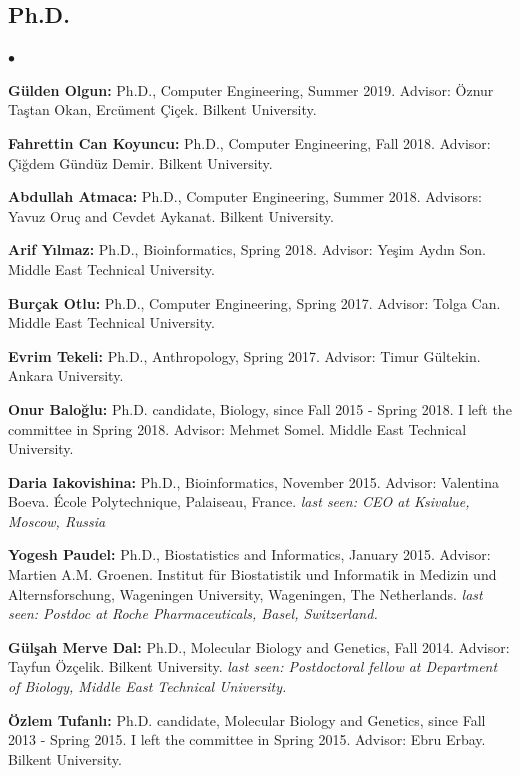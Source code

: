\documentclass[margin,line]{res}
\newenvironment{list2}{
  \begin{list}{$\bullet$}{%
      \setlength{\itemsep}{0.1cm}
      \setlength{\parsep}{0in} \setlength{\parskip}{0in}
      \setlength{\topsep}{0in} \setlength{\partopsep}{0in} 
      \setlength{\leftmargin}{0.2in}}}{\end{list}}
\begin{document}
\begin{resume}
\subsection{\small \sc Ph.D.}
\begin{list2}
\item
  {\bf Gülden Olgun:} Ph.D., Computer Engineering, Summer 2019.
  Advisor: Öznur Taştan Okan, Ercüment Çiçek.
  Bilkent University.
\item
  {\bf Fahrettin Can Koyuncu:} Ph.D., Computer Engineering, Fall 2018.
  Advisor: Çiğdem Gündüz Demir.
  Bilkent University.
\item
  {\bf Abdullah Atmaca:} Ph.D., Computer Engineering, Summer 2018.
  Advisors: Yavuz Oruç and Cevdet Aykanat.
  Bilkent University.
\item
  {\bf Arif Yılmaz:} Ph.D., Bioinformatics, Spring 2018.
  Advisor: Yeşim Aydın Son.
  Middle East Technical University.
\item 
  {\bf Burçak Otlu:} Ph.D., Computer Engineering, Spring 2017.
  Advisor: Tolga Can.
  Middle East Technical University. 
\item 
  {\bf Evrim Tekeli:} Ph.D., Anthropology,  Spring 2017.
  Advisor: Timur G\"{u}ltekin.
  Ankara University. 
\item
  {\bf Onur Baloğlu:} Ph.D. candidate, Biology, since Fall 2015 - Spring 2018. I left the committee in Spring 2018.
  Advisor: Mehmet Somel.
  Middle East Technical University.
\item
  {\bf Daria Iakovishina:} Ph.D., Bioinformatics,  November 2015.
  Advisor:  Valentina Boeva.
  École Polytechnique, Palaiseau, France.
  {\it last seen: CEO at Ksivalue, Moscow, Russia}
\item
  {\bf Yogesh Paudel:} Ph.D., Biostatistics and Informatics,  January 2015.
  Advisor: Martien A.M. Groenen.
  Institut für Biostatistik und Informatik in Medizin und Alternsforschung,  Wageningen University, Wageningen, The Netherlands.
  {\it last seen: Postdoc at Roche Pharmaceuticals, Basel, Switzerland.}
\item
  {\bf G\"{u}l\c{s}ah Merve Dal:} Ph.D., Molecular Biology and Genetics, Fall 2014.
  Advisor: Tayfun Özçelik.
  Bilkent University. {\it last seen: Postdoctoral fellow at Department of Biology, Middle East Technical University.}
\item
  {\bf Özlem Tufanlı:} Ph.D. candidate, Molecular Biology and Genetics, since Fall 2013 - Spring 2015. I left the committee in Spring 2015.
  Advisor: Ebru Erbay.
  Bilkent University.
  \end{list2}


\end{resume}
\end{document}
